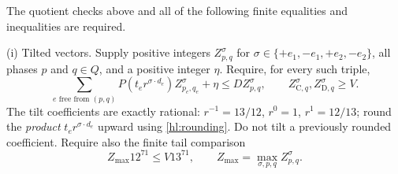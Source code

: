 \begin{definition}[H3-line]\label{hl:finite}
The quotient checks above and all of the following finite
equalities and inequalities are required.

\smallskip\noindent
\textup{(i) Tilted vectors.}
Supply positive integers $Z^\sigma_{p,q}$ for
$\sigma\in\{+e_1,-e_1,+e_2,-e_2\}$, all phases $p$ and $q\in Q$,
and a positive integer $\eta$.  Require, for every such triple,
\begin{equation}\label{hl:tiltcheck}
 \sum_{e\text{ free from }(p,q)}P(t_e r^{\sigma\cdot d_e})
                         Z^\sigma_{p_e,q_e}+\eta
             \le D Z^\sigma_{p,q},
 \qquad Z^\sigma_{\mathrm C,q},Z^\sigma_{\mathrm D,q}\ge V.
\end{equation}
The tilt coefficients are exactly rational: $r^{-1}=13/12$,
$r^0=1$, $r^1=12/13$; round the \emph{product} $t_e r^{\sigma\cdot d_e}$
upward using \eqref{hl:rounding}.  Do not tilt a previously rounded
coefficient.  Require also the finite tail comparison
\begin{equation}\label{hl:tailbound}
 Z_{\max}12^{71}\le V13^{71},\qquad
 Z_{\max}=\max_{\sigma,p,q}Z^\sigma_{p,q}.
\end{equation}


\end{definition}
